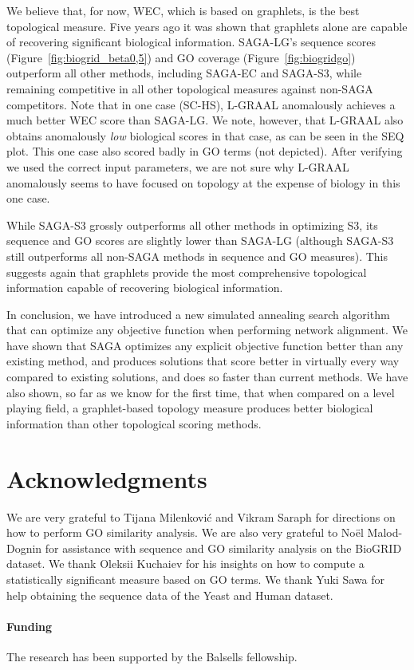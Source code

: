 \documentclass{bioinfo}
\begin{document}
We believe that, for now, WEC, which is based on graphlets, is the best topological measure. Five years ago \citep{GRAAL} it was shown that graphlets alone are capable of recovering significant biological information. SAGA-LG's sequence scores (Figure~\ref{fig:biogrid_beta0,5}) and GO coverage (Figure~\ref{fig:biogridgo}) outperform all other methods, including SAGA-EC and SAGA-S3, while remaining competitive in all other topological measures against non-SAGA competitors. Note that in one case (SC-HS), L-GRAAL anomalously achieves a much better WEC score than SAGA-LG. We note, however, that L-GRAAL also obtains anomalously \textit{low} biological scores in that case, as can be seen in the SEQ plot. This one case also scored badly in GO terms (not depicted). After verifying we used the correct input parameters, we are not sure why L-GRAAL anomalously seems to have focused on topology at the expense of biology in this one case.

While SAGA-S3 grossly outperforms all other methods in optimizing S3, its sequence and GO scores are slightly lower than SAGA-LG (although SAGA-S3 still outperforms all non-SAGA methods in sequence and GO measures). This suggests again that graphlets provide the most comprehensive topological information capable of recovering biological information.

In conclusion, we have introduced a new simulated annealing search algorithm that can optimize any objective function when performing network alignment.  We have shown that SAGA optimizes any explicit objective function better than any existing method, and produces solutions that score better in virtually every way compared to existing solutions, and does so faster than current methods. We have also shown, so far as we know for the first time, that when compared on a level playing field, a graphlet-based topology measure produces better biological information than other topological scoring methods.

\section*{Acknowledgments}

We are very grateful to Tijana Milenkovi\'{c} and Vikram Saraph for directions on how to perform GO similarity analysis. We are also very grateful to No{\"e}l Malod-Dognin for assistance with sequence and GO similarity analysis on the BioGRID dataset. We thank Oleksii Kuchaiev for his insights on how to compute a statistically significant measure based on GO terms. We thank Yuki Sawa for help obtaining the sequence data of the Yeast and Human dataset.

\paragraph{Funding} The research has been supported by the Balsells fellowship.



\end{document}
